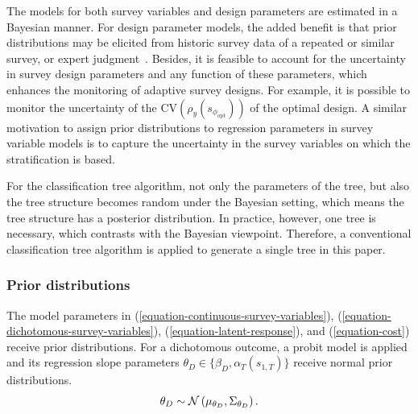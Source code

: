 \documentclass[12pt]{article}
\begin{document}
The models for both survey variables and design parameters are estimated in a Bayesian manner.
For design parameter models, the added benefit is that prior distributions may be elicited from historic survey data of a repeated or similar survey, or expert judgment\unskip~\cite{Schouten:2018:jssm}.
Besides, it is feasible to account for the uncertainty in survey design parameters and any function of these parameters, which enhances the monitoring of adaptive survey designs.
For example, it is possible to monitor the uncertainty of the $\mathrm{CV}\left(\rho_y(s_{\phi_{\mathrm{opt}}})\right)$ of the optimal design.
A similar motivation to assign prior distributions to regression parameters in survey variable models is to capture the uncertainty in the survey variables on which the stratification is based.

For the classification tree algorithm, not only the parameters of the tree, but also the tree structure becomes random under the Bayesian setting, which means the tree structure has a posterior distribution.
In practice, however, one tree is necessary, which contrasts with the Bayesian viewpoint.
Therefore, a conventional classification tree algorithm is applied to generate a single tree in this paper.


\subsubsection{Prior distributions}
\label{subsubsec:prior-distributions}

The model parameters in (\ref{equation-continuous-survey-variables}), (\ref{equation-dichotomous-survey-variables}), (\ref{equation-latent-response}), and (\ref{equation-cost}) receive prior distributions.
For a dichotomous outcome, a probit model is applied and its regression slope parameters $\theta_D \in \{\beta_{D},\alpha_{T}(s_{1,T})\}$ receive normal prior distributions.
\let\saveeqnno\theequation
\let\savefrac\frac
\def\dispfrac{\displaystyle\savefrac}
\begin{eqnarray}
\let\frac\dispfrac
\gdef\theequation{6}
\let\theHequation\theequation
\label{equation-prior-dichotomous-slope}
	\theta_D \sim \mathcal{N}\left(\mu_{\theta_D},\Sigma_{\theta_D}\right).
\end{eqnarray}
\global\let\theequation\saveeqnno
\addtocounter{equation}{-1}\ignorespaces
\end{document}
